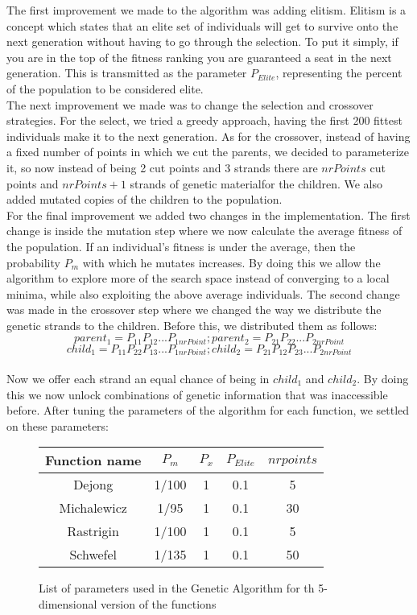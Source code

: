 \documentclass{article}
\begin{document}
The first improvement we made to the algorithm was adding elitism. Elitism is a concept which states that an elite set of individuals will get to survive onto the next generation without having to go through the selection. To put it simply, if you are in the top of the fitness ranking you are guaranteed a seat in the next generation. This is transmitted as the parameter $P_{Elite}$, representing the percent of the population to be considered elite.\\
The next improvement we made was to change the selection and crossover strategies. For the select, we tried a greedy approach, having the first 200 fittest individuals make it to the next generation. As for the crossover, instead of having a fixed number of points in which we cut the parents, we decided to parameterize it, so now instead of being 2 cut points and 3 strands there are $nrPoints$ cut points and $nrPoints + 1$ strands of genetic materialfor the children. We also added mutated copies of the children to the population.\\
For the final improvement we added two changes in the implementation. The first change is inside the mutation step where we now calculate the average fitness of the population. If an individual's fitness is under the average, then the probability $P_m$ with which he mutates increases. By doing this we allow the algorithm to explore more of the search space instead of converging to a local minima, while also exploiting the above average individuals. The second change was made in the crossover step where we changed the way we distribute the genetic strands to the children. Before this, we distributed them as follows: $$ parent_1 = P_{11} P_{12} ... P_{1nrPoint};   parent_2 = P_{21} P_{22} ... P_{2nrPoint}$$ $$ child_1 = P_{11} P_{22} P_{13} ... P_{1nrPoint};   child_2 = P_{21} P_{12} P_{23} ... P_{2nrPoint}$$\\
Now we offer each strand an equal chance of being in $child_1$ and $child_2$. By doing this we now unlock combinations of genetic information that was inaccessible before. After tuning the parameters of the algorithm for each function, we settled on these parameters:

\begin{figure}[H]
	\begin{tabular}{|c||c|c|c|c|} \hline
		Function name & $P_m$ & $P_x$ & $P_{Elite}$ &  $nrpoints$\\ \hline \hline
		Dejong & 1/100 & 1 & 0.1 & 5 \\ \hline
		Michalewicz & 1/95 & 1 & 0.1 & 30\\ \hline
		Rastrigin & 1/100 & 1 & 0.1 & 5 \\ \hline
		Schwefel & 1/135 & 1 & 0.1 & 50 \\ \hline
\end{tabular}
\caption{List of parameters used in the Genetic Algorithm for th 5-dimensional version of the functions}
\end{figure}
\end{document}
